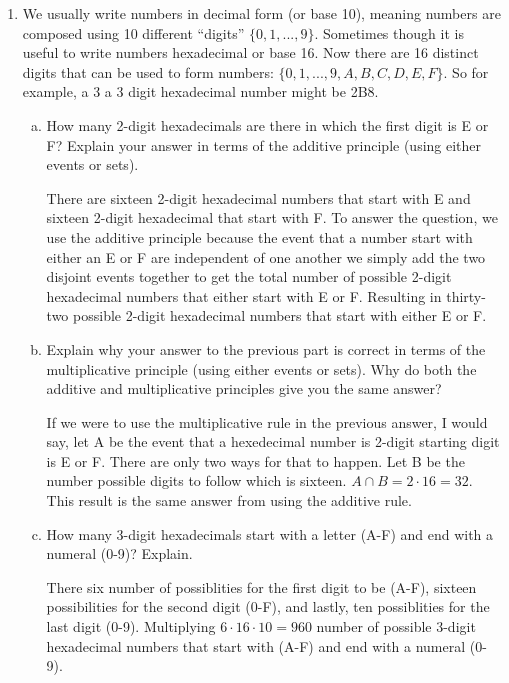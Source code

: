 \documentclass[11pt, a4paper]{article}
\newcommand\setItemNumber[1]{\setcounter{enumi}{\numexpr#1-1\relax}}
\begin{document}
    \begin{enumerate} 
    
        \setItemNumber{4}
        \item We usually write numbers in decimal form (or base 10), meaning numbers are composed using 10 different “digits” $\{0,1,...,9\}$. Sometimes though it is useful to write numbers hexadecimal or base 16. Now there are 16 distinct digits that can be used to form numbers: $\{0,1,...,9,A,B,C,D,E,F\}$. So for example, a 3 a 3 digit hexadecimal number might be 2B8.
        \begin{enumerate}[(a)]

            \item How many 2-digit hexadecimals are there in which the first digit is E or F? Explain your answer in terms of the additive principle (using either events or sets).
            
            There are sixteen 2-digit hexadecimal numbers that start with E and sixteen 2-digit hexadecimal that start with F. To answer the question, we use the additive principle because the event that a number start with either an E or F are independent of one another we simply add the two disjoint events together to get the total number of possible 2-digit hexadecimal numbers that either start with E or F. Resulting in thirty-two possible 2-digit hexadecimal numbers that start with either E or F.

            \item Explain why your answer to the previous part is correct in terms of the multiplicative principle (using either events or sets). Why do both the additive and multiplicative principles give you the same answer?

                If we were to use the multiplicative rule in the previous answer, I would say, let A be the event that a hexedecimal number is 2-digit starting digit is E or F. There are only two ways for that to happen. Let B be the number possible digits to follow which is sixteen. $A\cap B = 2 \cdot 16 = 32$. This result is the same answer from using the additive rule.
            
            \item How many 3-digit hexadecimals start with a letter (A-F) and end with a numeral (0-9)? Explain.

                There six number of possiblities for the first digit to be (A-F), sixteen possibilities for the second digit (0-F), and lastly, ten possiblities for the last digit (0-9). Multiplying $6 \cdot 16 \cdot 10 = 960$ number of possible 3-digit hexadecimal numbers that start with (A-F) and end with a numeral (0-9). 


\end{enumerate}
\end{enumerate}
\end{document}
